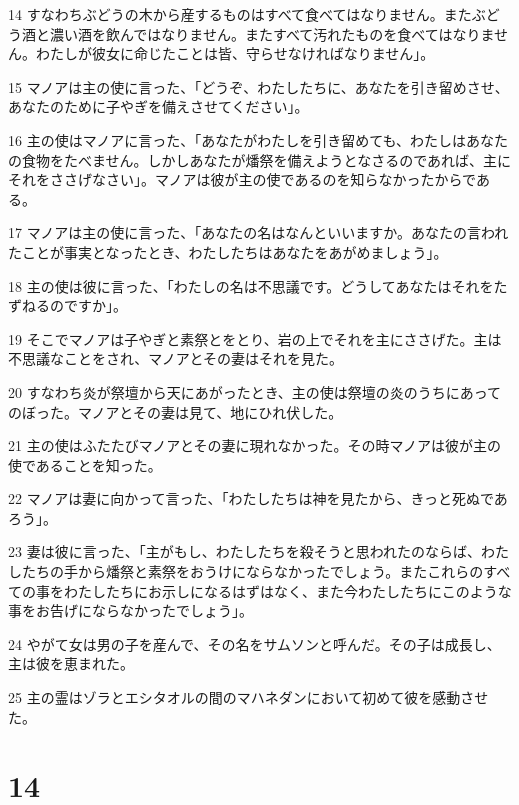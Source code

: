 \par 14 すなわちぶどうの木から産するものはすべて食べてはなりません。またぶどう酒と濃い酒を飲んではなりません。またすべて汚れたものを食べてはなりません。わたしが彼女に命じたことは皆、守らせなければなりません」。
\par 15 マノアは主の使に言った、「どうぞ、わたしたちに、あなたを引き留めさせ、あなたのために子やぎを備えさせてください」。
\par 16 主の使はマノアに言った、「あなたがわたしを引き留めても、わたしはあなたの食物をたべません。しかしあなたが燔祭を備えようとなさるのであれば、主にそれをささげなさい」。マノアは彼が主の使であるのを知らなかったからである。
\par 17 マノアは主の使に言った、「あなたの名はなんといいますか。あなたの言われたことが事実となったとき、わたしたちはあなたをあがめましょう」。
\par 18 主の使は彼に言った、「わたしの名は不思議です。どうしてあなたはそれをたずねるのですか」。
\par 19 そこでマノアは子やぎと素祭とをとり、岩の上でそれを主にささげた。主は不思議なことをされ、マノアとその妻はそれを見た。
\par 20 すなわち炎が祭壇から天にあがったとき、主の使は祭壇の炎のうちにあってのぼった。マノアとその妻は見て、地にひれ伏した。
\par 21 主の使はふたたびマノアとその妻に現れなかった。その時マノアは彼が主の使であることを知った。
\par 22 マノアは妻に向かって言った、「わたしたちは神を見たから、きっと死ぬであろう」。
\par 23 妻は彼に言った、「主がもし、わたしたちを殺そうと思われたのならば、わたしたちの手から燔祭と素祭をおうけにならなかったでしょう。またこれらのすべての事をわたしたちにお示しになるはずはなく、また今わたしたちにこのような事をお告げにならなかったでしょう」。
\par 24 やがて女は男の子を産んで、その名をサムソンと呼んだ。その子は成長し、主は彼を恵まれた。
\par 25 主の霊はゾラとエシタオルの間のマハネダンにおいて初めて彼を感動させた。

\chapter{14}

